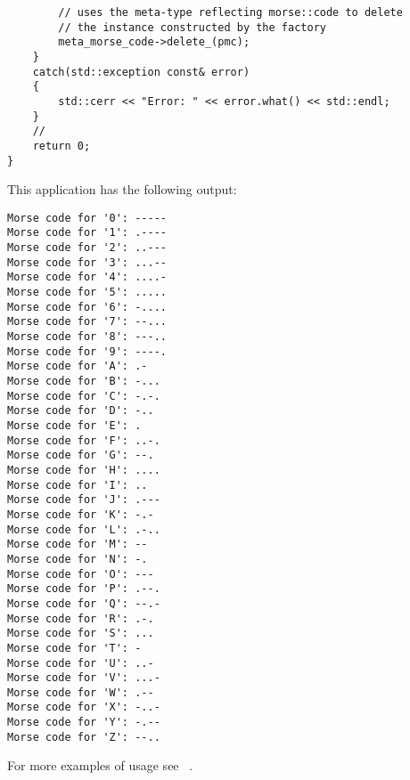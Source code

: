 \begin{lstlisting}
        // uses the meta-type reflecting morse::code to delete
        // the instance constructed by the factory
        meta_morse_code->delete_(pmc);
    }
    catch(std::exception const& error)
    {
        std::cerr << "Error: " << error.what() << std::endl;
    }
    //
    return 0;
}
\end{lstlisting}

This application has the following output:

\begin{verbatim}
Morse code for '0': -----
Morse code for '1': .----
Morse code for '2': ..---
Morse code for '3': ...--
Morse code for '4': ....-
Morse code for '5': .....
Morse code for '6': -....
Morse code for '7': --...
Morse code for '8': ---..
Morse code for '9': ----.
Morse code for 'A': .-
Morse code for 'B': -...
Morse code for 'C': -.-.
Morse code for 'D': -..
Morse code for 'E': .
Morse code for 'F': ..-.
Morse code for 'G': --.
Morse code for 'H': ....
Morse code for 'I': ..
Morse code for 'J': .---
Morse code for 'K': -.-
Morse code for 'L': .-..
Morse code for 'M': --
Morse code for 'N': -.
Morse code for 'O': ---
Morse code for 'P': .--.
Morse code for 'Q': --.-
Morse code for 'R': .-.
Morse code for 'S': ...
Morse code for 'T': -
Morse code for 'U': ..-
Morse code for 'V': ...-
Morse code for 'W': .--
Morse code for 'X': -..-
Morse code for 'Y': -.--
Morse code for 'Z': --..
\end{verbatim}

For more examples of usage see ~\cite{mirror-doc-lagoon-examples}.

